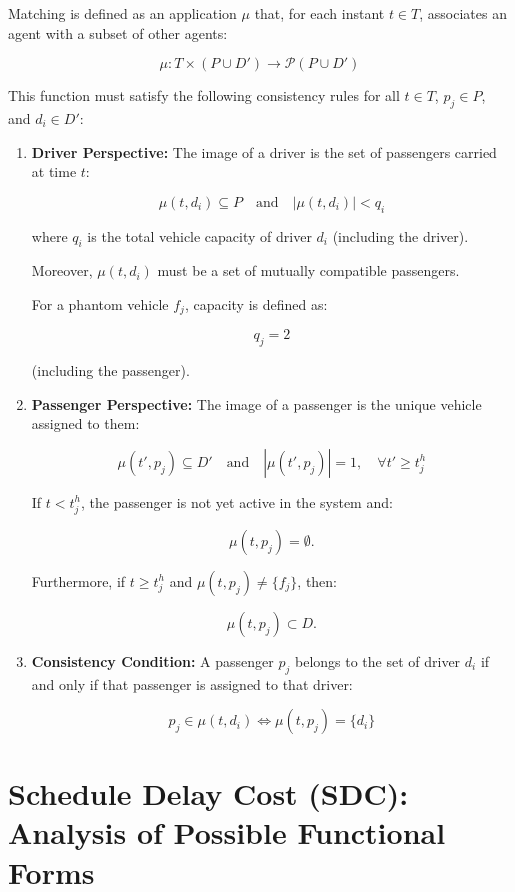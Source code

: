 \documentclass[12pt, a4paper]{article}
\begin{document}
Matching is defined as an application $\mu$ that, for each instant $t \in T$, associates an agent with a subset of other agents:

$$
\mu: T \times (P \cup D') \to \mathcal{P}(P \cup D')
$$

This function must satisfy the following consistency rules for all
$t \in T$, $p_j \in P$, and $d_i \in D'$:

\begin{enumerate}
    \item \textbf{Driver Perspective:}
    The image of a driver is the set of passengers carried at time $t$:

$$
\mu(t,d_i)\subseteq P
\quad\text{and}\quad
|\mu(t,d_i)|<q_i
$$

where $q_i$ is the total vehicle capacity of driver $d_i$ (including the driver).

Moreover, $\mu(t,d_i)$ must be a set of mutually compatible passengers.

For a phantom vehicle $f_j$, capacity is defined as:

$$
q_j=2
$$

(including the passenger).

    \item \textbf{Passenger Perspective:}
    The image of a passenger is the unique vehicle assigned to them:

$$
\mu(t',p_j)\subseteq D'
\quad\text{and}\quad
|\mu(t',p_j)|=1,
\quad \forall t' \geq t_j^h
$$

If $t<t_j^h$, the passenger is not yet active in the system and:

$$
\mu(t,p_j)=\emptyset.
$$

Furthermore, if $t\geq t_j^h$ and $\mu(t,p_j)\neq\{f_j\}$, then:

$$
\mu(t,p_j)\subset D.
$$

    \item \textbf{Consistency Condition:}
    A passenger $p_j$ belongs to the set of driver $d_i$ if and only if that passenger is assigned to that driver:

$$
p_j\in\mu(t,d_i)
\iff
\mu(t,p_j)=\{d_i\}
$$

\end{enumerate}

\section{Schedule Delay Cost (SDC): Analysis of Possible Functional Forms}
\end{document}
